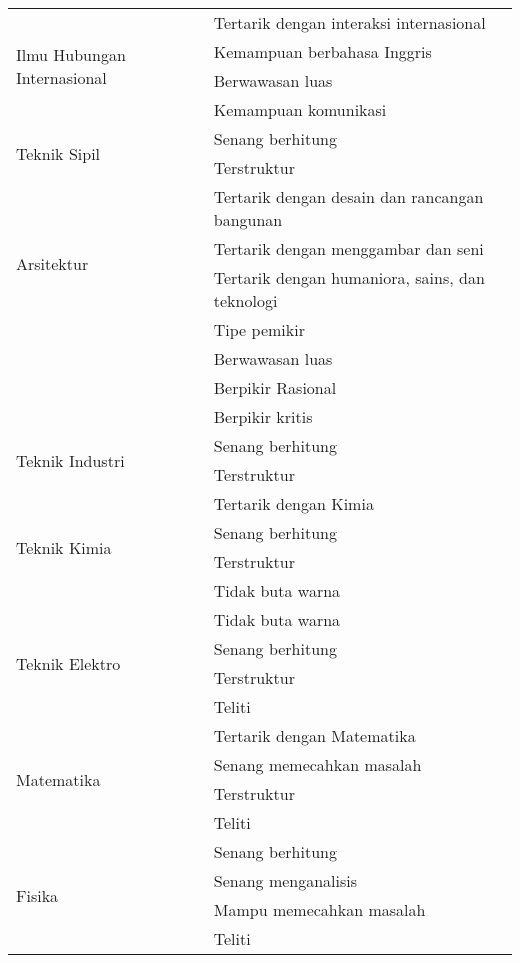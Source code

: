 \begin{longtable}[H]{| p{6cm} | p{8cm} |}
		\hline
		\multirow{4}{10em}{Ilmu Hubungan Internasional} & Tertarik dengan interaksi internasional \\
		& Kemampuan berbahasa Inggris \\
		& Berwawasan luas \\
		& Kemampuan komunikasi\\
		
		\hline
		\multirow{2}{10em}{Teknik Sipil} & Senang berhitung \\
		& Terstruktur \\
		
		\hline
		\multirow{4}{10em}{Arsitektur} & Tertarik dengan desain dan rancangan bangunan \\
		& Tertarik dengan menggambar dan seni\\
		& Tertarik dengan humaniora, sains, dan teknologi \\
		
		\hline
		\multirow{4}{10em}{Ilmu Filsafat} & Tipe pemikir \\
		& Berwawasan luas \\
		& Berpikir Rasional \\
		& Berpikir kritis \\
		
		\hline
		\multirow{2}{10em}{Teknik Industri} &  Senang berhitung \\
		& Terstruktur \\
		
		\hline
		\multirow{4}{10em}{Teknik Kimia} & Tertarik dengan Kimia \\
		& Senang berhitung \\
		& Terstruktur \\
		& Tidak buta warna\\
		
		\hline
		\multirow{4}{10em}{Teknik Elektro} & Tidak buta warna \\
		& Senang berhitung \\
		& Terstruktur \\
		& Teliti \\

		\hline
		\multirow{4}{10em}{Matematika} & Tertarik dengan Matematika \\
		& Senang memecahkan masalah \\
		& Terstruktur \\
		& Teliti \\
		
		\hline
		\multirow{4}{10em}{Fisika} & Senang berhitung \\
		& Senang menganalisis \\
		& Mampu memecahkan masalah\\
		& Teliti \\
		

\end{longtable}
